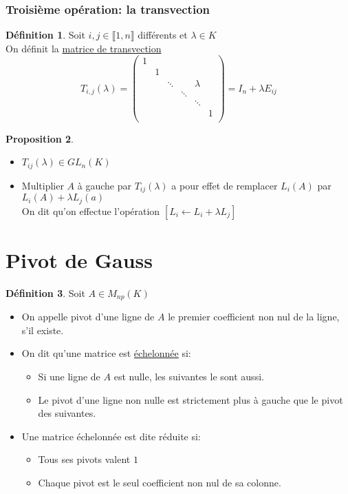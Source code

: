 \documentclass[10pt,a4paper]{article}
\theoremstyle{definition}
\newtheorem{proposition}{Proposition}[section]
\newtheorem{definition}[proposition]{Définition}
\begin{document}
\subsubsection{Troisième opération: la transvection}
\begin{definition}
Soit $i, j \in \llbracket 1, n \rrbracket$ différents et $\lambda \in K$ \\
On définit la \uline{matrice de transvection}
\[ T_{i, j}(\lambda) = \begin{pmatrix}
1 & & & & & \\
& 1 & & & & \\
& & \ddots & & \lambda & \\
& & & \ddots & & \\
& & & & \ddots & \\
& & & & & 1 \\
\end{pmatrix} = I_n + \lambda E_{ij}\]
\end{definition}
\begin{proposition}
\hfill
\begin{itemize}
\item $T_{ij}(\lambda) \in GL_n(K)$
\item Multiplier $A$ à gauche par $T_{ij}(\lambda)$ a pour effet de remplacer $L_i(A)$ par $L_i(A) + \lambda L_j(a)$ \\
On dit qu'on effectue l'opération $\left[ L_i \leftarrow L_i + \lambda L_j \right]$
\end{itemize}
\end{proposition}

\section{Pivot de Gauss}
\begin{definition}
Soit $A \in M_{np}(K)$
\begin{itemize}
\item On appelle pivot d'une ligne de $A$ le premier coefficient non nul de la ligne, s'il existe.
\item On dit qu'une matrice est \uline{échelonnée} si:
\begin{itemize}
\item Si une ligne de $A$ est nulle, les suivantes le sont aussi.
\item Le pivot d'une ligne non nulle est strictement plus à gauche que le pivot des suivantes.
\end{itemize}
\item Une matrice échelonnée est dite réduite si:
\begin{itemize}
\item Tous ses pivots valent $1$
\item Chaque pivot est le seul coefficient non nul de sa colonne.
\end{itemize}
\end{itemize}
\end{definition}
\end{document}
